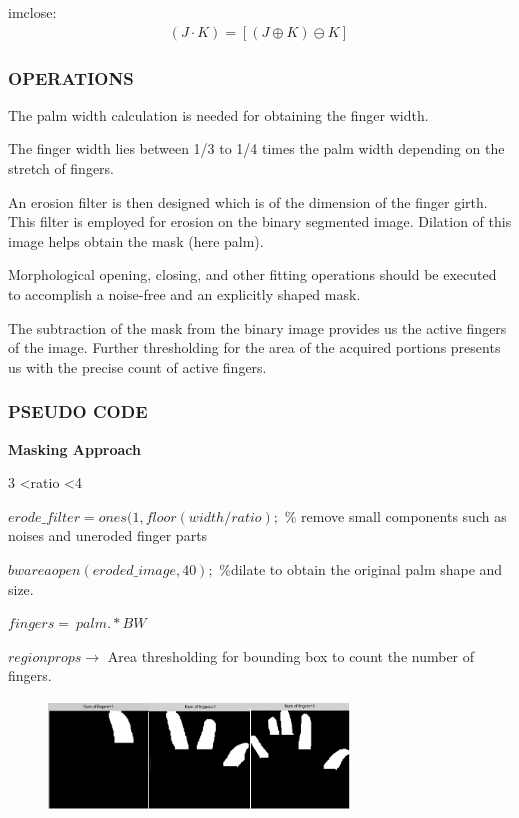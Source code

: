 \documentclass[conference]{IEEEtran}
\begin{document}
imclose:
\begin{equation}
\begin{aligned}
\left(J  \cdot  K\right) =  \left[\left(J \oplus K \right) \ominus K \right]\,
\end{aligned}
\end{equation}


\subsubsection{OPERATIONS}
The palm width calculation is needed for obtaining the finger width.

The finger width lies between 1/3 to 1/4 times the palm width depending on the stretch of fingers.

An erosion filter is then designed which is of the dimension of the finger girth. This filter is employed for erosion on the binary segmented image. Dilation of this image helps obtain the mask (here palm).

Morphological opening, closing, and other fitting operations should be executed to accomplish a noise-free and an explicitly shaped mask.

The subtraction of the mask \cite{7279962} from the binary image provides us the active fingers of the image. Further thresholding for the area of the acquired portions presents us with the precise count of active fingers.


\subsubsection{PSEUDO CODE}

\textbf{Masking Approach}
\begin{flushleft}
3 \textless ratio \textless 4

$erode\_filter=ones(1,floor(width/ratio); $ \% remove small components such as noises and uneroded finger parts
 
$bwareaopen(eroded\_image,40);$ \%dilate to obtain the original palm shape and size. 

$fingers=~palm.*BW$ 

$regionprops \rightarrow$ Area thresholding for bounding box to count the number of fingers.

\begin{figure}[h!]
	\centering
	\includegraphics[width = 8cm, height = 3cm]{method1_1}
\end{figure}
\end{flushleft}
\end{document}
